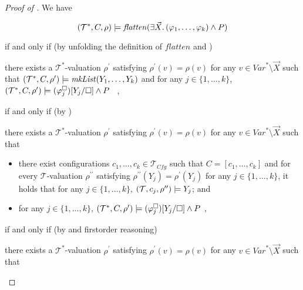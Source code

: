 \begin{proof}[Proof of ]
    We have
    \begin{proofenv}
        \begin{equation*}
            (\mathcal{T}^*, C, \rho) \models \mathit{flatten}(\exists \vec{X}.\, (\varphi_1,\ldots,\varphi_k) \land P)
        \end{equation*}
    \end{proofenv}
    if and only if (by unfolding the definition of $\mathit{flatten}$ and )
    \begin{proofenv}
        there exists a $\mathcal{T}^*$-valuation $\rho^\prime$ satisfying $\rho^\prime(v) = \rho(v)$
        for any $v \in \mathit{Var}^* \setminus \vec{X}$ such that
        $(\mathcal{T}^*, C, \rho^\prime) \models \mathit{mkList}(Y_1,\ldots,Y_k)$
        and for any $j \in \{ 1, \ldots, k \}$,
        $(\mathcal{T}^*, C, \rho^\prime) \models (\varphi_j^{\square})[Y_j/\square] \land P$ \, ,
    \end{proofenv}
    if and only if (by )
    \begin{proofenv}
        there exists a $\mathcal{T}^*$-valuation $\rho^\prime$ satisfying $\rho^\prime(v) = \rho(v)$
        for any $v \in \mathit{Var}^* \setminus \vec{X}$ such that
        \begin{itemize}
            \item there exist configurations $c_1, \ldots, c_k \in \mathcal{T}_{\mathit{Cfg}}$ such that
                    $C = [c_1, \ldots, c_k]$
                    and for every $\mathcal{T}$-valuation $\rho^{\prime\prime}$
                    satisfying $\rho^{\prime\prime}(Y_j) = \rho^\prime(Y_j)$ for any $j \in \{ 1, \ldots, k \}$,
                    it holds that for any $j \in \{ 1, \ldots, k \}$,
                    $(\mathcal{T}, c_j, \rho^{\prime\prime}) \models Y_j$; and
            \item for any $j \in \{ 1, \ldots, k \}$,
                    $(\mathcal{T}^*, C, \rho^\prime) \models (\varphi_j^{\square})[Y_j/\square] \land P$ ,
        \end{itemize}
    \end{proofenv}
    if and only if (by  and firstorder reasoning)
    \begin{proofenv}
        there exists a $\mathcal{T}^*$-valuation $\rho^\prime$ satisfying $\rho^\prime(v) = \rho(v)$
        for any $v \in \mathit{Var}^* \setminus \vec{X}$ such that
        \begin{itemize}

\end{itemize}
\end{proofenv}
\end{proof}
